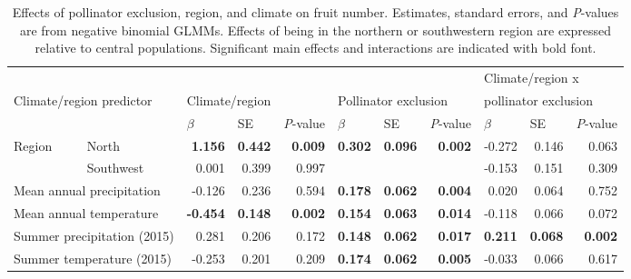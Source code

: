 \documentclass{article}
\begin{document}
\begin{landscape}
\clearpage


\begin{table}[p]
\centering
\caption[Effects of pollinator exclusion, region, and climate on fruit number.]{Effects of pollinator exclusion, region, and climate on fruit number. Estimates, standard errors, and \textit{P}-values are from negative binomial GLMMs. Effects of being in the northern or southwestern region are expressed relative to central populations. Significant main effects and interactions are indicated with bold font.}
\label{fruitstable}
\begin{tabular}{llrrrrrrrrr}
\toprule
                            &                     &  & &                        &  &  &   & \multicolumn{3}{l}{Climate/region x}           \\
\multicolumn{2}{l}{Climate/region predictor}                    & \multicolumn{3}{l}{Climate/region} &    \multicolumn{3}{l}{Pollinator exclusion}                               & \multicolumn{3}{l}{pollinator exclusion} \\
                            &                     & \multicolumn{1}{l}{$\beta$} & \multicolumn{1}{l}{SE} & \multicolumn{1}{l}{\textit{P}-value} &  \multicolumn{1}{l}{$\beta$}  & \multicolumn{1}{l}{SE} &  \multicolumn{1}{l}{\textit{P}-value} &  \multicolumn{1}{l}{$\beta$}  & \multicolumn{1}{l}{SE} &  \multicolumn{1}{l}{\textit{P}-value} \\
\midrule
\multirow{2}{*}{Region}     & North               & \textbf{1.156}   & \textbf{0.442}  & \textbf{0.009} & \multirow{2}{*}{\textbf{0.302}} & \multirow{2}{*}{\textbf{0.096}} & \multirow{2}{*}{\textbf{0.002}} & -0.272 & 0.146 & 0.063 \\
                            & Southwest           & 0.001   & 0.399  & 0.997 &        &       &       & -0.153 & 0.151  & 0.309  \\
\midrule
\multicolumn{2}{l}{Mean annual precipitation}     & -0.126  & 0.236  & 0.594 & \textbf{0.178}  & \textbf{0.062} & \textbf{0.004} & 0.020  & 0.064  & 0.752  \\
\multicolumn{2}{l}{Mean annual temperature}       & \textbf{-0.454}  & \textbf{0.148}  & \textbf{0.002} & \textbf{0.154}  & \textbf{0.063} & \textbf{0.014} & -0.118 & 0.066  & 0.072  \\
\multicolumn{2}{l}{Summer precipitation (2015)}   & 0.281   & 0.206  & 0.172 & \textbf{0.148}  & \textbf{0.062} & \textbf{0.017} & \textbf{0.211}  & \textbf{0.068}  & \textbf{0.002}  \\
\multicolumn{2}{l}{Summer temperature (2015)}     & -0.253  & 0.201  & 0.209 & \textbf{0.174}  & \textbf{0.062} & \textbf{0.005} & -0.033 & 0.066  & 0.617  \\
\bottomrule
\end{tabular}
\end{table}


\end{landscape}
\end{document}
